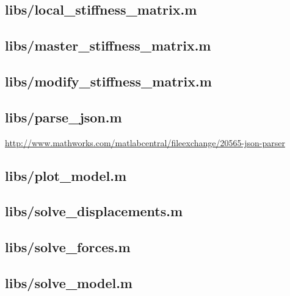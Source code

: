 \documentclass{article}
\begin{document}
\begin{appendices}
\subsection{libs/local\_stiffness\_matrix.m}\label{app:libs/local_stiffness_matrix.m}


\subsection{libs/master\_stiffness\_matrix.m}\label{app:libs/master_stiffness_matrix.m}


\subsection{libs/modify\_stiffness\_matrix.m}\label{app:libs/modify_stiffness_matrix.m}


\subsection{libs/parse\_json.m}\label{app:libs/parse_json.m}
\url{http://www.mathworks.com/matlabcentral/fileexchange/20565-json-parser}

\subsection{libs/plot\_model.m}\label{app:libs/plot_model.m}


\subsection{libs/solve\_displacements.m}\label{app:libs/solve_displacements.m}


\subsection{libs/solve\_forces.m}\label{app:libs/solve_forces.m}


\subsection{libs/solve\_model.m}\label{app:libs/solve_model.m}



\end{appendices}
\end{document}
